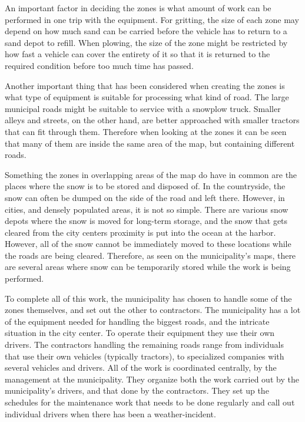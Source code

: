 An important factor in deciding the zones is what amount of work can be performed in one trip with the equipment. For gritting, the size of each zone may depend on how much sand can be carried before the vehicle has to return to a sand depot to refill. When plowing, the size of the zone might be restricted by how fast a vehicle can cover the entirety of it so that it is returned to the required condition before too much time has passed.

Another important thing that has been considered when creating the zones is what type of equipment is suitable for processing what kind of road. The large municipal roads might be suitable to service with a snowplow truck. Smaller alleys and streets, on the other hand, are better approached with smaller tractors that can fit through them. Therefore when looking at the zones it can be seen that many of them are inside the same area of the map, but containing different roads.

Something the zones in overlapping areas of the map do have in common are the places where the snow is to be stored and disposed of. In the countryside, the snow can often be dumped on the side of the road and left there. However, in cities, and densely populated areas, it is not so simple. There are various snow depots where the snow is moved for long-term storage, and the snow that gets cleared from the city centers proximity is put into the ocean at the harbor. However, all of the snow cannot be immediately moved to these locations while the roads are being cleared. Therefore, as seen on the municipality's maps, there are several areas where snow can be temporarily stored while the work is being performed.

To complete all of this work, the municipality has chosen to handle some of the zones themselves, and set out the other to contractors. The municipality has a lot of the equipment needed for handling the biggest roads, and the intricate situation in the city center. To operate their equipment they use their own drivers. The contractors handling the remaining roads range from individuals that use their own vehicles (typically tractors), to specialized companies with several vehicles and drivers. All of the work is coordinated centrally, by the management at the municipality. They organize both the work carried out by the municipality's drivers, and that done by the contractors. They set up the schedules for the maintenance work that needs to be done regularly and call out individual drivers when there has been a weather-incident.

